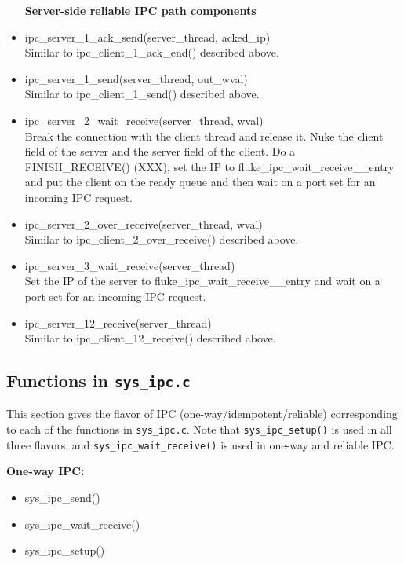 \begin{itemize}
\textbf{Server-side reliable IPC path components}\\
\item ipc_server_1_ack_send(server_thread, acked_ip)\\
 Similar to ipc_client_1_ack_end() described above.

\item ipc_server_1_send(server_thread, out_wval)\\
 Similar to ipc_client_1_send() described above.

\item ipc_server_2_wait_receive(server_thread, wval)\\
 Break the connection with the client thread and release it. Nuke the
 client field of the server and the server field of the client. Do a
 FINISH_RECEIVE() (XXX), set the IP to fluke_ipc_wait_receive__entry
 and put the client on the ready queue and then 
 wait on a port set for an incoming IPC request.

\item ipc_server_2_over_receive(server_thread, wval)\\
 Similar to ipc_client_2_over_receive() described above.

\item ipc_server_3_wait_receive(server_thread)\\
 Set the IP of the server to fluke_ipc_wait_receive__entry and wait
 on a port set for an incoming IPC request.

\item ipc_server_12_receive(server_thread)\\
 Similar to ipc_client_12_receive() described above.

\end{itemize}

\subsection{Functions in {\tt sys_ipc.c}}
This section gives the flavor of IPC (one-way/idempotent/reliable)
corresponding to each of the functions in {\tt sys_ipc.c}.
Note that {\tt sys_ipc_setup()} is used in all three flavors, and
{\tt sys_ipc_wait_receive()} is used in one-way and reliable IPC.

\noindent \textbf{One-way IPC:}

\begin{itemize}
\item  sys_ipc_send()
\item  sys_ipc_wait_receive()
\item  sys_ipc_setup()
\end{itemize}

